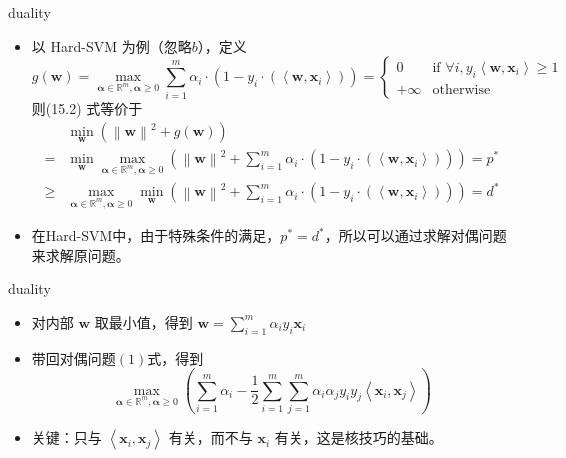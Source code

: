 \begin{frame}[fragile]{duality}
    \begin{itemize}
        \item 以 Hard-SVM 为例（忽略$b$），定义
        \[
            g(\mathbf{w}) =\max_{\mathbf\alpha\in \mathbb{R}^{m},\mathbf \alpha \geqslant 0} \sum_{i=1}^{m} \alpha_i \cdot (1- y_i \cdot (\left\langle \mathbf{w}, \mathbf{x}_i \right\rangle)) = \begin{cases} 0 &\text{if }\forall i, y_i\left\langle \mathbf{w}, \mathbf{x}_i \right\rangle \geqslant 1   \\ +\infty & \text{otherwise} \end{cases}
        \]
        则(15.2) 式等价于
        \begin{align*}
            &\min_{\mathbf{w}} \left( \left\| \mathbf{w} \right\|^{2} + g(\mathbf{w})  \right)  \\
            = & \min_{\mathbf{w}} \max_{\mathbf\alpha\in \mathbb{R}^{m}, \mathbf\alpha \geqslant 0} \left( \left\| \mathbf{w} \right\|^{2} + \sum_{i=1}^{m} \alpha_i \cdot (1- y_i \cdot (\left\langle \mathbf{w}, \mathbf{x}_i \right\rangle))  \right) = p^{*} \\
            \geqslant & \max_{\mathbf\alpha\in \mathbb{R}^{m}, \mathbf\alpha \geqslant 0} \min_{\mathbf{w}} \left( \left\| \mathbf{w} \right\|^{2} + \sum_{i=1}^{m} \alpha_i \cdot (1- y_i \cdot (\left\langle \mathbf{w}, \mathbf{x}_i \right\rangle))  \right) = d^{*} \tag{1}
        \end{align*}

        \item 在Hard-SVM中，由于特殊条件的满足，$p^{*} = d^{*}$，所以可以通过求解对偶问题来求解原问题。
    \end{itemize}
\end{frame}

\begin{frame}[fragile]{duality}
    \begin{itemize}
        \item 对内部 $\mathbf{w}$ 取最小值，得到 $\mathbf{w} = \sum_{i=1}^{m} \alpha_i y_i \mathbf{x}_i$
        \item 带回对偶问题$(1)$式，得到 
        \[
            \max_{\mathbf\alpha\in \mathbb{R}^{m}, \mathbf\alpha \geqslant 0} \left( \sum_{i=1}^{m} \alpha_i - \frac{1}{2} \sum_{i=1}^{m} \sum_{j=1}^{m} \alpha_i \alpha_j y_i y_j \left\langle \mathbf{x}_i, \mathbf{x}_j \right\rangle  \right)
        \]
        \item 关键：只与 $\left\langle \mathbf{x}_i, \mathbf{x}_j \right\rangle$ 有关，而不与 $\mathbf{x}_i$ 有关，这是核技巧的基础。
    \end{itemize}
\end{frame}

